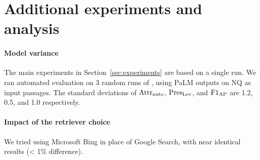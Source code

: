 \documentclass[11pt]{article}
\begin{document}
\appendix

\section{Additional experiments and analysis} \label{app:more-experiments}


\paragraph{Model variance}
The main experiments in Section~\ref{sec:experiments} are based on a single run.
We ran automated evaluation on 3 random runs of \approach{}, using PaLM outputs on NQ as input passages.
The standard deviations of $\text{Attr}_\text{auto}{}$, $\text{Pres}_\text{Lev}{}$, and $\HM{}$ are 1.2, 0.5, and 1.0 respectively.

\paragraph{Impact of the retriever choice}
We tried using Microsoft Bing in place of Google Search, with near identical results (< 1\% difference).


\begin{table}[!t]
\centering\small\setlength{\tabcolsep}{5pt}
\caption{\textbf{Additional ablation results.} We report the automatic metrics: $\attrauto$, $\preslev$, and harmonic mean between the two ($\HM{}$). We show auto-AIS scores both before and after editing (before $\rightarrow$ edit), with respect to the attribution report $A$ produced by the model.
}
\label{tab:ablation_results_upper}
\end{table}
\end{document}
